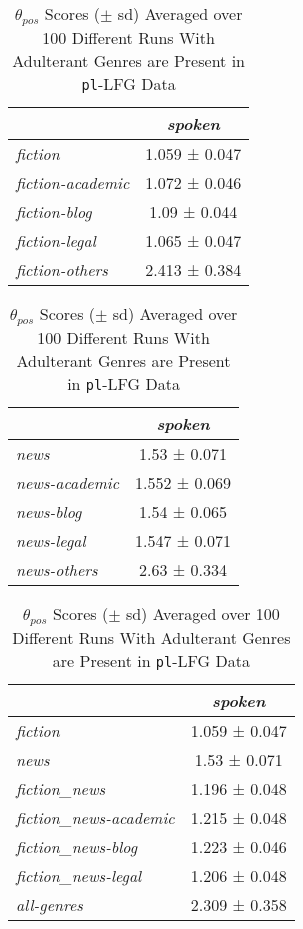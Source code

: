 \begin{table}[H]
    \centering
    \begin{tabular}{|l|c|}
        \hline
         & \textit{spoken} \\
         \hline
        \textit{fiction} & 1.059 ± 0.047 \\
        \textit{fiction-academic} & 1.072 ± 0.046 \\
        \textit{fiction-blog} & 1.09 ± 0.044 \\
        \textit{fiction-legal} & 1.065 ± 0.047 \\
        \textit{fiction-others} & 2.413 ± 0.384 \\
        \hline
    \end{tabular}%
    \hspace{1mm}
    \begin{tabular}{|l|c|}
        \hline
         & \textit{spoken} \\
         \hline
        \textit{news} & 1.53 ± 0.071 \\
        \textit{news-academic} & 1.552 ± 0.069 \\
        \textit{news-blog} & 1.54 ± 0.065 \\
        \textit{news-legal} & 1.547 ± 0.071 \\
        \textit{news-others} & 2.63 ± 0.334 \\
        \hline
    \end{tabular}%
    \vspace{5mm}
    \begin{tabular}{|l|c|}
        \hline
         & \textit{spoken} \\
         \hline
        \textit{fiction} & 1.059 ± 0.047 \\
        \textit{news} & 1.53 ± 0.071 \\
        \textit{fiction\_news} & 1.196 ± 0.048 \\
        \textit{fiction\_news-academic} & 1.215 ± 0.048 \\
        \textit{fiction\_news-blog} & 1.223 ± 0.046 \\
        \textit{fiction\_news-legal} & 1.206 ± 0.048 \\
        \textit{all-genres} & 2.309 ± 0.358 \\
        \hline
    \end{tabular}
    \caption{$\theta_{pos}$ Scores ($\pm$ sd) Averaged over 100 Different Runs With Adulterant Genres are Present in \texttt{pl}-LFG Data}
    \label{tab:adulterant-scores}
\end{table}

